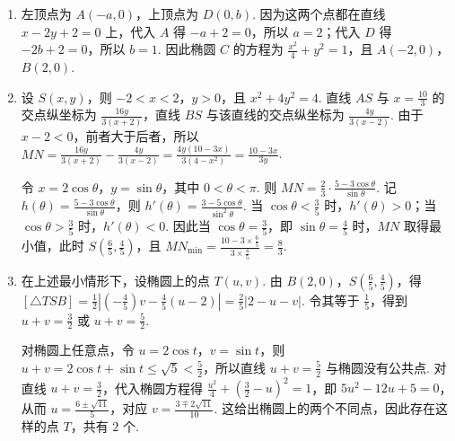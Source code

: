 \begin{solution}
\begin{enumerate}
\item 左顶点为 \(A(-a,0)\)，上顶点为 \(D(0,b)\). 因为这两个点都在直线 \(x-2y+2=0\) 上，代入 \(A\) 得 \(-a+2=0\)，所以 \(a=2\)；代入 \(D\) 得 \(-2b+2=0\)，所以 \(b=1\). 因此椭圆 \(C\) 的方程为 \(\frac{x^2}{4}+y^2=1\)，且 \(A(-2,0)\)，\(B(2,0)\).
\item 设 \(S(x,y)\)，则 \(-2<x<2\)，\(y>0\)，且 \(x^2+4y^2=4\). 直线 \(AS\) 与 \(x=\frac{10}{3}\) 的交点纵坐标为 \(\frac{16y}{3(x+2)}\)，直线 \(BS\) 与该直线的交点纵坐标为 \(\frac{4y}{3(x-2)}\). 由于 \(x-2<0\)，前者大于后者，所以 \(MN=\frac{16y}{3(x+2)}-\frac{4y}{3(x-2)}=\frac{4y(10-3x)}{3(4-x^2)}=\frac{10-3x}{3y}\).

令 \(x=2\cos\theta\)，\(y=\sin\theta\)，其中 \(0<\theta<\pi\). 则 \(MN=\frac{2}{3}\cdot\frac{5-3\cos\theta}{\sin\theta}\). 记 \(h(\theta)=\frac{5-3\cos\theta}{\sin\theta}\)，则 \(h'(\theta)=\frac{3-5\cos\theta}{\sin^2\theta}\). 当 \(\cos\theta<\frac{3}{5}\) 时，\(h'(\theta)>0\)；当 \(\cos\theta>\frac{3}{5}\) 时，\(h'(\theta)<0\). 因此当 \(\cos\theta=\frac{3}{5}\)，即 \(\sin\theta=\frac{4}{5}\) 时，\(MN\) 取得最小值，此时 \(S\left(\frac{6}{5},\frac{4}{5}\right)\)，且 \(MN_{\min}=\frac{10-3\times\frac{6}{5}}{3\times\frac{4}{5}}=\frac{8}{3}\).
\item 在上述最小情形下，设椭圆上的点 \(T(u,v)\). 由 \(B(2,0)\)，\(S\left(\frac{6}{5},\frac{4}{5}\right)\)，得 \([\triangle TSB]=\frac{1}{2}\left|\left(-\frac{4}{5}\right)v-\frac{4}{5}(u-2)\right|=\frac{2}{5}\left|2-u-v\right|\). 令其等于 \(\frac{1}{5}\)，得到 \(u+v=\frac{3}{2}\) 或 \(u+v=\frac{5}{2}\).

对椭圆上任意点，令 \(u=2\cos t\)，\(v=\sin t\)，则 \(u+v=2\cos t+\sin t\leqslant\sqrt{5}<\frac{5}{2}\)，所以直线 \(u+v=\frac{5}{2}\) 与椭圆没有公共点. 对直线 \(u+v=\frac{3}{2}\)，代入椭圆方程得 \(\frac{u^2}{4}+\left(\frac{3}{2}-u\right)^2=1\)，即 \(5u^2-12u+5=0\)，从而 \(u=\frac{6\pm\sqrt{11}}{5}\)，对应 \(v=\frac{3\mp2\sqrt{11}}{10}\). 这给出椭圆上的两个不同点，因此存在这样的点 \(T\)，共有 \(2\) 个.
\end{enumerate}
\end{solution}
